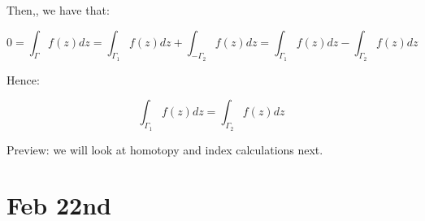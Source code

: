 \documentclass[10pt]{article}
\begin{document}
Then,, we have that:

$$ 0 = \int_\Gamma f(z) dz = \int_{\Gamma_1} f(z) dz + \int_{-\Gamma_2} f(z) dz =  \int_{\Gamma_1} f(z) dz - \int_{\Gamma_2} f(z) dz$$

Hence:

$$ \int_{\Gamma_1} f(z) dz  = \int_{\Gamma_2} f(z) dz$$

Preview: we will look at homotopy and index calculations next.

\section*{Feb 22nd}
\end{document}
